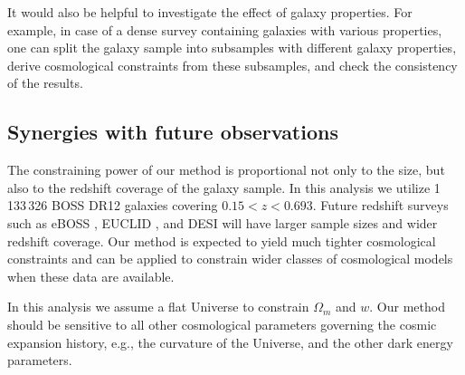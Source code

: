 \documentclass[iop]{emulateapj}
\begin{document}
It would also be helpful to investigate the effect of galaxy properties.
For example, in case of a dense survey containing galaxies with various properties, 
one can split the galaxy sample into subsamples with different galaxy properties, 
derive cosmological constraints from these subsamples, 
and check the consistency of the results. 



\subsection{Synergies with future observations}

The constraining power of our method is proportional not only to the size, 
but also to the redshift coverage of the galaxy sample.
In this analysis we utilize 1\,133\,326 BOSS DR12 galaxies covering $0.15< z < 0.693$.
Future redshift surveys such as eBOSS \citep{eBOSS}, EUCLID \citep{EUCLID}, and DESI \citep{DESI}
will have larger sample sizes and wider redshift coverage.
Our method is expected to yield much tighter cosmological constraints
and can be applied to constrain wider classes of 
cosmological models when these data are available.

In this analysis we assume a flat Universe to constrain $\Omega_m$ and $w$.
Our method should be sensitive to all other cosmological parameters governing the cosmic expansion history,
e.g., the curvature of the Universe, 
and the other dark energy parameters.
\end{document}
